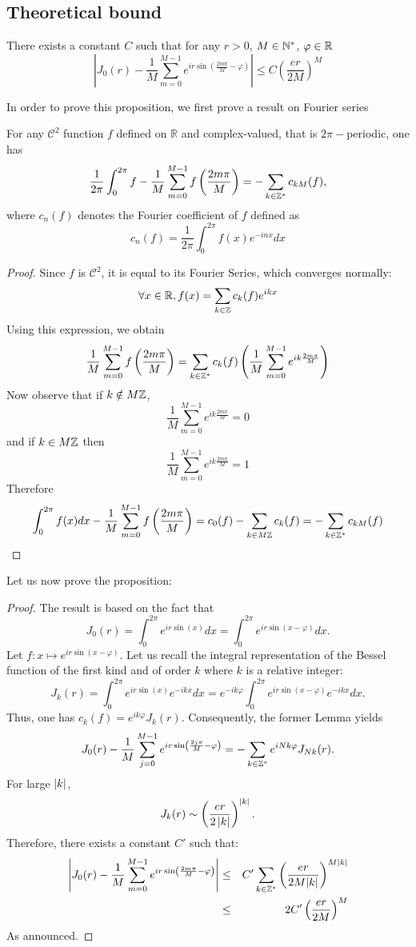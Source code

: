 \documentclass[11pt,a4paper]{article}
\begin{document}
\subsection{Theoretical bound}
\begin{The} There exists a constant $C$ such that for any $r>0$, $M\in \mathbb{N}^*$, $\varphi \in \mathbb{R}$ 
	\[\left|J_0(r) -  \dfrac{1}{M}\sum_{m=0}^{M-1}e^{ir\sin\left(\frac{2m\pi}{M}-\varphi\right)} \right| \leq C \left(\dfrac{er}{2M}\right)^M\]
	\label{QuadratureCirc}
\end{The}
\noindent In order to prove this proposition, we first prove a result on Fourier series
\begin{Lem} For any $\mathcal{C}^2$ function $f$ defined on $\mathbb{R}$ and complex-valued, that is $2\pi-$periodic, one has \[\dfrac{1}{2\pi}\int_{0}^{2\pi}f - \dfrac{1}{M}\sum_{m=0}^{M-1}f\left(\frac{2m\pi}{M} \right) = - \sum\limits_{k \in \mathbb{Z}^*}c_{kM}(f),\]
	where $c_n(f)$ denotes the Fourier coefficient of $f$ defined as \[c_n(f) = \dfrac{1}{2\pi}\int_{0}^{2\pi}f(x)e^{-inx}dx\]
	\begin{proof}
		Since $f$ is $\mathcal{C}^2$, it is equal to its Fourier Series, which converges normally: \[\forall x \in \mathbb{R}, f(x) = \sum_{k\in\mathbb{Z}} c_k(f)e^{ikx}\] Using this expression, we obtain \[\dfrac{1}{M}\sum_{m=0}^{M-1}f\left(\frac{2m\pi}{M}\right) = \sum\limits_{k\in \mathbb{Z}^*}c_k(f)\left(\frac{1}{M}\sum_{m=0}^{M-1}e^{ik\frac{2m\pi}{M}}\right)\] Now observe that if $k\notin M\mathbb{Z}$, \[\dfrac{1}{M}\sum_{m=0}^{M-1}e^{ik\frac{2m\pi}{M}} = 0\] and if $k\in M\mathbb{Z}$ then \[\dfrac{1}{M}\sum_{m=0}^{M-1}e^{ik\frac{2m\pi}{M}} = 1\] Therefore \[\int_{0}^{2\pi}f(x)dx - \dfrac{1}{M}\sum_{m=0}^{M-1}f\left(\frac{2m\pi}{M} \right) = c_0(f) - \sum\limits_{k \in M\mathbb{Z}}c_{k}(f) = - \sum\limits_{k \in \mathbb{Z}^*}c_{kM}(f)\qedhere\]
	\end{proof}
\end{Lem}
\noindent Let us now prove the proposition: 
\begin{proof}
	The result is based on the fact that 
	\[J_0(r) =  \int_0^{2\pi} e^{ir\sin(x)}dx = \int_0^{2\pi} e^{ir\sin(x - \varphi)}dx.\] 
	Let $f : x \mapsto e^{ir\sin(x - \varphi)}$. Let us recall the integral representation of the Bessel function of the first kind and of order $k$ where $k$ is a relative integer: \[J_k(r) =  \int_{0}^{2\pi}e^{ir\sin(x)}e^{-ikx}dx =  e^{-ik\varphi}\int_{0}^{2\pi}e^{ir\sin(x - \varphi)}e^{-ikx}dx.\] Thus, one has $c_k(f) = e^{ik\varphi}J_k(r)$. Consequently, the former Lemma yields 
	\[J_0(r) -  \dfrac{1}{M} \sum_{j=0}^{M-1} e^{ir \sin \left( \frac{2j\pi}{M}-\varphi \right)} = -\sum_{k\in \mathbb{Z}^*}e^{iNk\varphi}J_{Nk}(r).\] 
	For large $\left\lvert k \right\rvert$,
	\[J_k(r) \sim \left(\dfrac{er}{2\left\lvert k \right\rvert}\right)^{\left\lvert k \right\rvert}.\]
	Therefore, there exists a constant $C'$ such that: 
	\begin{eqnarray*}
		\left\lvert J_0(r) -  \dfrac{1}{M}\sum_{m=0}^{M-1}e^{ir\sin\left(\frac{2m\pi}{M}-\varphi\right)} \right\rvert &\leq& C' \sum_{k\in \mathbb{Z}^*} \left(\dfrac{er}{2M|k|}\right)^{M|k|}\\
		&\leq& 2 C' \left(\dfrac{er}{2M}\right)^M
	\end{eqnarray*}
	As announced.\qedhere	
\end{proof}
\end{document}
